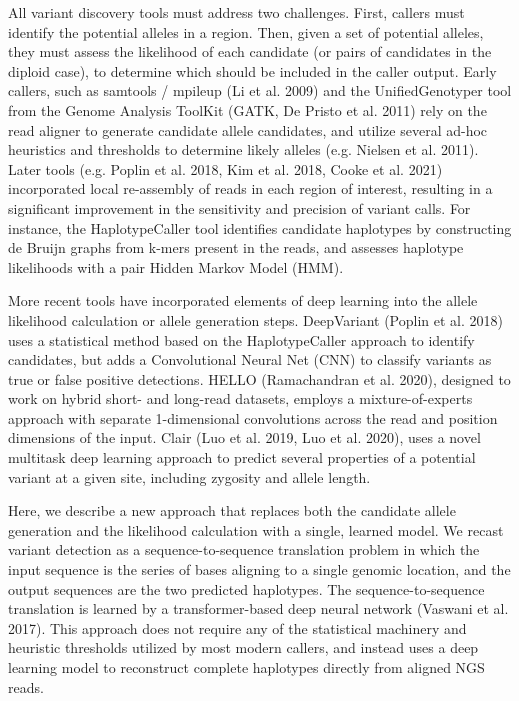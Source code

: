 \documentclass[]{article}
\begin{document}
All variant discovery tools must address two challenges. First, callers must identify the potential alleles in a region. Then, given a set of potential alleles, they must assess the likelihood of each candidate (or pairs of candidates in the diploid case), to determine which should be included in the caller output. Early callers, such as samtools / mpileup (Li et al. 2009) and the UnifiedGenotyper tool from the Genome Analysis ToolKit (GATK, De Pristo et al. 2011) rely on the read aligner to generate candidate allele candidates, and utilize several ad-hoc heuristics and thresholds to determine likely alleles (e.g. Nielsen et al. 2011). Later tools (e.g. Poplin et al. 2018, Kim et al. 2018, Cooke et al. 2021) incorporated local re-assembly of reads in each region of interest, resulting in a significant improvement in the sensitivity and precision of variant calls. For instance, the HaplotypeCaller tool identifies candidate haplotypes by constructing de Bruijn graphs from k-mers present in the reads, and assesses haplotype likelihoods with a pair Hidden Markov Model (HMM). 

More recent tools have incorporated elements of deep learning into the allele likelihood calculation or allele generation steps. DeepVariant (Poplin et al. 2018) uses a statistical method based on the HaplotypeCaller approach to identify candidates, but adds a Convolutional Neural Net (CNN) to classify variants as true or false positive detections. HELLO (Ramachandran et al. 2020), designed to work on hybrid short- and long-read datasets, employs a mixture-of-experts approach with separate 1-dimensional convolutions across the read and position dimensions of the input. Clair (Luo et al. 2019, Luo et al. 2020), uses a novel multitask deep learning approach to predict several properties of a potential variant at a given site, including zygosity and allele length. 

Here, we describe a new approach that replaces both the candidate allele generation and the likelihood calculation with a single, learned model. We recast variant detection as a sequence-to-sequence translation problem in which the input sequence is the series of bases aligning to a single genomic location, and the output sequences are the two predicted haplotypes. The sequence-to-sequence translation is learned by a transformer-based deep neural network (Vaswani et al. 2017). This approach does not require any of the statistical machinery and heuristic thresholds utilized by most modern callers, and instead uses a deep learning model to reconstruct complete haplotypes directly from aligned NGS reads. 
\end{document}

